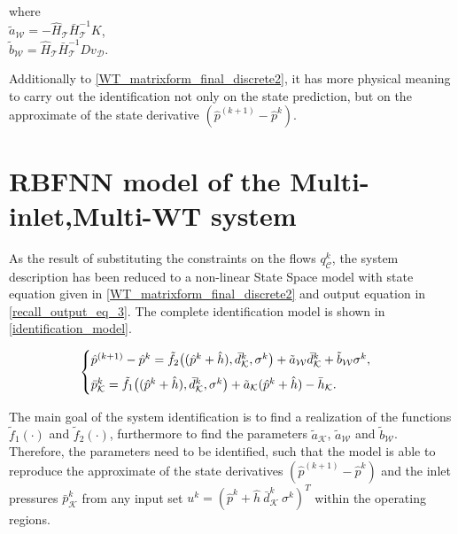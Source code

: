 \vspace{-1mm} 

\begin{minipage}[t]{0.4\textwidth}
where\\
\hspace*{8mm} $\tilde{a}_{\mathcal{W}} = - \hat{H}_{\mathcal{T}} \bar{H}^{-1}_{\mathcal{T}} K $, \vspace*{1.5mm}\\
\hspace*{8mm} $\tilde{b}_{\mathcal{W}} = \hat{H}_{\mathcal{T}} \bar{H}^{-1}_{\mathcal{T}} D v_{\mathcal{D}} $.
\end{minipage}

Additionally to \eqref{WT_matrixform_final_discrete2}, it has more physical meaning to carry out the identification not only on the state prediction, but on the approximate of the state derivative $(\hat{p}^{(k+1)} \! - \!\hat{p}^{k})$. 

\section{RBFNN model of the Multi-inlet,Multi-WT system}
\label{RBFNN_model_multi_inlet_multi_WT_sys} 

As the result of substituting the constraints on the flows $q^{k}_{\mathcal{C}}$, the system description has been reduced to a non-linear State Space model with state equation given in \eqref {WT_matrixform_final_discrete2} and output equation in \eqref {recall_output_eq_3}. The complete identification model is shown in \eqref{identification_model}. 

\begin{equation}
\begin{cases}
  \label{identification_model}
    \hat{p}^{(k+1)} - \hat{p}^{k} = \tilde{f}_2 \big((\hat{p}^{k} + \hat{h}),\bar{d}^{k}_{\mathcal{K}}, \sigma^{k}\big) + \tilde{a}_{\mathcal{W}} \bar{d}^{k}_{\mathcal{K}} + \tilde{b}_{\mathcal{W}} \sigma^{k},\vspace{2mm}\\ 
  \bar{p}^{k}_{\mathcal{K}}  = \tilde{f}_1 \big((\hat{p}^{k} + \hat{h}),\bar{d}^{k}_{\mathcal{K}}, \sigma^{k}\big) + \tilde{a}_{\mathcal{K}} (\hat{p}^{k} + \hat{h}) - \bar{h}_{\mathcal{K}}.
  \end{cases}
\end{equation} 

The main goal of the system identification is to find a realization of the functions $\tilde{f}_1(\cdot)$ and $\tilde{f}_2(\cdot)$, furthermore to find the parameters $\tilde{a}_{\mathcal{K}}$, $\tilde{a}_{\mathcal{W}}$ and $\tilde{b}_{\mathcal{W}}$. Therefore, the parameters need to be identified, such that the model is able to reproduce the approximate of the state derivatives $(\hat{p}^{(k+1)} \! - \! \hat{p}^{k})$ and the inlet pressures $\bar{p}^{k}_{\mathcal{K}}$ from any input set $u^k = ( \hat{p}^{k}\! + \!\hat{h} \ \bar{d}^{k}_{\mathcal{K}} \ \sigma^{k} )^T$ within the operating regions.

